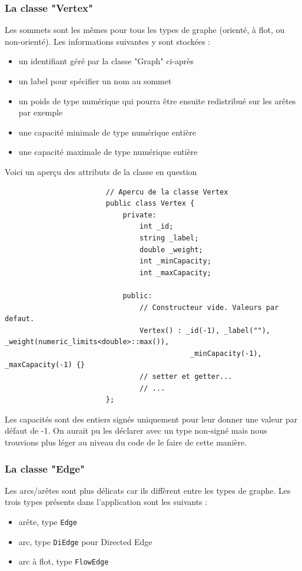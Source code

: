 \documentclass[french]{article}
\begin{document}
			\subsubsection{La classe "Vertex"}
			Les sommets sont les mêmes pour tous les types de graphe (orienté, à flot, ou non-orienté). Les informations suivantes y sont stockées :
			\begin{itemize}
				\item un identifiant géré par la classe "Graph" ci-après
				\item un label pour spécifier un nom au sommet
				\item un poids de type numérique qui pourra être ensuite redistribué sur les arêtes par exemple
				\item une capacité minimale de type numérique entière
				\item une capacité maximale de type numérique entière 
			\end{itemize}
			Voici un aperçu des attributs de la classe en question
			\begin{lstlisting}
						// Apercu de la classe Vertex
						public class Vertex {
							private:
								int _id;
								string _label;
								double _weight;
								int _minCapacity;
								int _maxCapacity;
								
							public:
								// Constructeur vide. Valeurs par defaut.
								Vertex() : _id(-1), _label(""), _weight(numeric_limits<double>::max()),
											_minCapacity(-1), _maxCapacity(-1) {}
								// setter et getter...
								// ...
						};
			\end{lstlisting}
			Les capacités sont des entiers signés uniquement pour leur donner une valeur par défaut de -1. On aurait pu les déclarer avec un type non-signé mais nous trouvions plus léger au niveau du code de le faire de cette manière.
			
			\subsubsection{La classe "Edge"}
			Les arcs/arêtes sont plus délicats car ils diffèrent entre les types de graphe. Les trois types présents dans l'application sont les suivants :
			\begin{itemize}
				\item arête, type \lstinline[basicstyle=\ttfamily\color{blue}]|Edge|
				\item arc, type \lstinline[basicstyle=\ttfamily\color{blue}]|DiEdge| pour Directed Edge
				\item arc à flot, type \lstinline[basicstyle=\ttfamily\color{blue}]|FlowEdge|\\
			\end{itemize}
			
\end{document}
